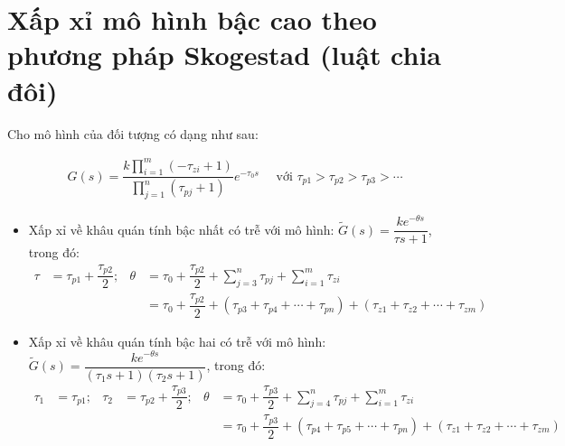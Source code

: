 \section{Xấp xỉ mô hình bậc cao theo phương pháp Skogestad (luật chia đôi)}

    Cho mô hình của đối tượng có dạng như sau:

    \begin{align*}
        G(s) = \dfrac{\displaystyle k \prod_{i=1}^m \left({-\tau_{zi} + 1}\right)}{\displaystyle \prod_{j=1}^n \left({\tau_{pj} + 1}\right)} e^{-\tau_0 s} \quad \textrm{ với } \tau_{p1} > \tau_{p2} > \tau_{p3} > \cdots
    \end{align*}

    \begin{itemize}
        \item Xấp xỉ về khâu quán tính bậc nhất có trễ với mô hình: $\tilde{G}(s) = \dfrac{k e^{-\theta s}}{\tau s + 1}$, trong đó:
            \begin{align*}
                \tau & = \tau_{p1} + \dfrac{\tau_{p2}}{2}; &
                \theta & = \tau_0 + \dfrac{\tau_{p2}}{2} + \sum_{j = 3}^n \tau_{pj} + \sum_{i = 1}^m \tau_{zi} \\
                & & & = \tau_0 + \dfrac{\tau_{p2}}{2} + \left({\tau_{p3} + \tau_{p4} + \cdots + \tau_{pn}}\right) + \left({\tau_{z1} + \tau_{z2} + \cdots + \tau_{zm}}\right)
            \end{align*}

        \item Xấp xỉ về khâu quán tính bậc hai có trễ với mô hình: $\tilde{G}(s) = \dfrac{k e^{-\theta s}}{\left({\tau_1 s + 1}\right) \left({\tau_2 s + 1}\right)}$, trong đó:
            \begin{align*}
                \tau_1 & = \tau_{p1}; & \tau_2 & = \tau_{p2} + \dfrac{\tau_{p3}}{2}; &
                \theta & = \tau_0 + \dfrac{\tau_{p3}}{2} + \sum_{j = 4}^n \tau_{pj} + \sum_{i = 1}^m \tau_{zi} \\
                & & & & & = \tau_0 + \dfrac{\tau_{p3}}{2} + \left({\tau_{p4} + \tau_{p5} + \cdots + \tau_{pn}}\right) + \left({\tau_{z1} + \tau_{z2} + \cdots + \tau_{zm}}\right)
                \end{align*}
    \end{itemize}

